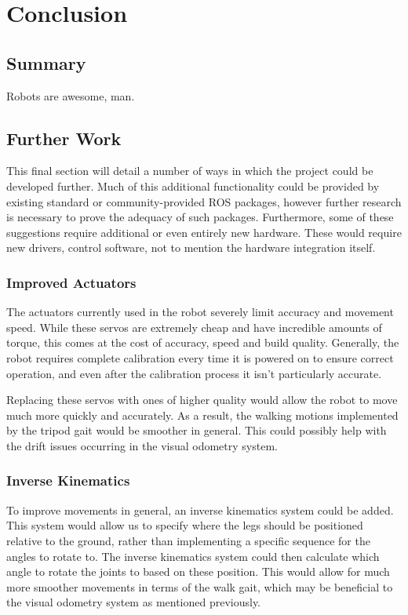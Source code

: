 \chapter{Conclusion}
\label{chap:conclusion}


\section{Summary}
Robots are awesome, man.


\section{Further Work}

This final section will detail a number of ways in which the project could be developed further. Much of this additional functionality could be provided by existing standard or community-provided ROS packages, however further research is necessary to prove the adequacy of such packages. Furthermore, some of these suggestions require additional or even entirely new hardware. These would require new drivers, control software, not to mention the hardware integration itself.

\subsection{Improved Actuators}
The actuators currently used in the robot severely limit accuracy and movement speed. While these servos are extremely cheap and have incredible amounts of torque, this comes at the cost of accuracy, speed and build quality. Generally, the robot requires complete calibration every time it is powered on to ensure correct operation, and even after the calibration process it isn't particularly accurate.

Replacing these servos with ones of higher quality would allow the robot to move much more quickly and accurately. As a result, the walking motions implemented by the tripod gait would be smoother in general. This could possibly help with the drift issues occurring in the visual odometry system.

\subsection{Inverse Kinematics}
To improve movements in general, an inverse kinematics system could be added. This system would allow us to specify where the legs should be positioned relative to the ground, rather than implementing a specific sequence for the angles to rotate to. The inverse kinematics system could then calculate which angle to rotate the joints to based on these position. This would allow for much more smoother movements in terms of the walk gait, which may be beneficial to the visual odometry system as mentioned previously.

